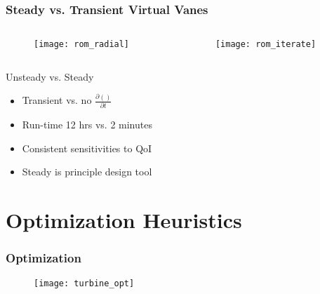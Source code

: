 \documentclass[mathserif]{beamer}
\begin{document}
%
%
\begin{frame}
 \frametitle{Steady vs. Transient Virtual Vanes}

 \begin{columns}[]
  \begin{column}{0.5\linewidth}

    \begin{figure}[htb]
     \centering
     \texttt{[image: rom\_radial]}
    \end{figure}

    \end{column}
  \begin{column}{0.5\linewidth}

    \begin{figure}[htb]
     \centering
     \texttt{[image: rom\_iterate]}
    \end{figure}

  \end{column}
 \end{columns}

 \begin{block}{Unsteady vs. Steady}
   \begin{itemize}
   \item Transient vs. no $\frac{\partial ()}{\partial t}$
   \item Run-time 12 hrs vs. 2 minutes
   \item Consistent sensitivities to QoI	
   \item Steady is principle design tool
   \end{itemize}
 \end{block}
 
\end{frame}


\section{Optimization Heuristics}
%
%
\begin{frame}
 \frametitle{Optimization}

    \begin{figure}[htb]
     \centering
     \texttt{[image: turbine\_opt]}
    \end{figure}
 
\end{frame}
\end{document}

